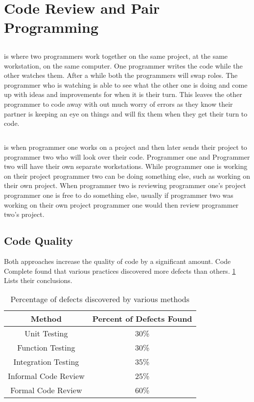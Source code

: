 \documentclass{article}
\begin{document}
\section{Code Review and Pair Programming}

\subsection{\PP}
\PP is where two programmers work together on the same project, at the same workstation, on the same computer. One programmer writes the code while the other watches them. After a while both the programmers will swap roles. The programmer who is watching is able to see what the other one is doing and come up with ideas and improvements for when it is their turn. This leaves the other programmer to code away with out much worry of errors as they know their partner is keeping an eye on things and will fix them when they get their turn to code.

\subsection{\CR}
\CR is when programmer one works on a project and then later sends their project to programmer two who will look over their code. Programmer one and Programmer two will have their own separate workstations. While programmer one is working on their project programmer two can be doing something else, such as working on their own project. When programmer two is reviewing programmer one's project programmer one is free to do something else, usually if programmer two was working on their own project programmer one would then review programmer two's project. 

\subsection{Code Quality}

Both approaches increase the quality of code by a significant amount. Code Complete\cite[Table 20-2]{McConnell:2004:CCS:1096143} found that various practices discovered more defects than others. \ref{tab:defect} Lists their conclusions.

\begin{table}[hb]
\begin{tabular}{c|c}
Method & Percent of Defects Found\\\hline
Unit Testing & 30\% \\
Function Testing & 30\% \\
Integration Testing & 35\% \\
Informal Code Review & 25\% \\
Formal Code Review & 60\%\\
\end{tabular}
\label{tab:defect}
\caption{Percentage of defects discovered by various methods}
\end{table}
\end{document}
